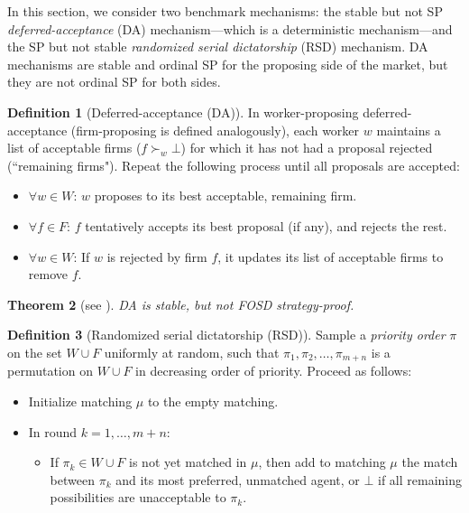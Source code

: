 \documentclass[11pt,letterpaper]{article}
\newtheorem{theorem}{Theorem}
\theoremstyle{definition}
\newtheorem{definition}[theorem]{Definition}
\newcommand{\kibitz}[2]{\ifnum\Comments=1{\color{#1}{#2}}\fi}
\newcommand{\zf}[1]{\kibitz{blue}{[ZF: #1]}}
\newcommand{\dcp}[1]{\kibitz{orange}{[DCP: #1]}}
\begin{document}
In this section, we consider two benchmark mechanisms: the stable but not SP \emph{deferred-acceptance} (DA) mechanism---which is a deterministic mechanism---and the SP but not stable \emph{randomized serial dictatorship} (RSD) mechanism.
%
DA mechanisms are stable and ordinal SP for the proposing side of the market,
but they are not ordinal SP for both sides. 
%
\begin{definition}[Deferred-acceptance (DA)]\label{def:DA}
In worker-proposing deferred-acceptance (firm-proposing is defined analogously), each worker $w$ maintains a list of acceptable firms ($f\succ_w \bot$) for which it has not had a proposal rejected (``remaining firms").
Repeat the following process until all proposals are accepted:
\begin{itemize}[leftmargin=*]
\item $\forall w\in W$: $w$ proposes to its best acceptable, remaining firm.
%
\item $\forall f\in F$: $f$ tentatively accepts its best proposal (if any), 
and rejects the rest.
%
\item $\forall w\in W$: If $w$ is rejected by firm $f$, it updates its list of acceptable firms to remove $f$.
\end{itemize}
\end{definition}

\begin{theorem}[see \cite{RothSotomayor1990}]
DA is stable, but not FOSD strategy-proof.
\end{theorem}

%
\begin{definition}[Randomized serial dictatorship (RSD)]\label{def:RSD}
Sample a {\em priority order} $\pi$ on the set $W\cup F$ uniformly at
random, such that $\pi_1, \pi_2, \ldots, \pi_{m+n}$ is a
permutation on $W\cup F$ in decreasing order of
priority. Proceed as follows:
%
\begin{itemize}[leftmargin=*]
\item Initialize matching $\mu$ to the empty matching. 
\item In round $k=1, \ldots, m+n$:
\begin{itemize}
\item If $\pi_k\in W\cup F$ is not yet matched in $\mu$, then add to
matching $\mu$ the match between $\pi_k$ and its most preferred,
unmatched agent, or $\bot$ if all
remaining possibilities are unacceptable to $\pi_k$.
\end{itemize}
\end{itemize}
%
\end{definition}
\end{document}
